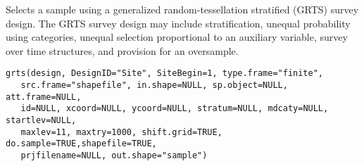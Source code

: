 \begin{Description}\relax
Selects a sample using a generalized random-tessellation stratified (GRTS)
survey design. The GRTS survey design may include stratification, unequal
probability using categories, unequal selection proportional to an auxiliary
variable, survey over time structures, and provision for an oversample.
\end{Description}
\begin{Usage}
\begin{verbatim}
grts(design, DesignID="Site", SiteBegin=1, type.frame="finite",
   src.frame="shapefile", in.shape=NULL, sp.object=NULL,  att.frame=NULL,
   id=NULL, xcoord=NULL, ycoord=NULL, stratum=NULL, mdcaty=NULL, startlev=NULL,
   maxlev=11, maxtry=1000, shift.grid=TRUE, do.sample=TRUE,shapefile=TRUE,
   prjfilename=NULL, out.shape="sample")
\end{verbatim}
\end{Usage}
